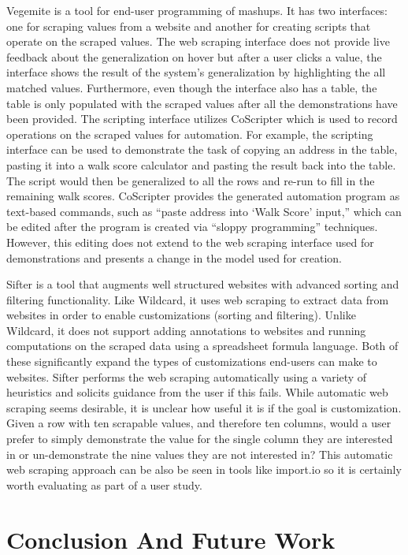 \documentclass[sigconf,10pt]{acmart}
\begin{document}
Vegemite \citep{lin2009} is a tool for end-user programming of mashups.
It has two interfaces: one for scraping values from a website and
another for creating scripts that operate on the scraped values. The web
scraping interface does not provide live feedback about the
generalization on hover but after a user clicks a value, the interface
shows the result of the system's generalization by highlighting the all
matched values. Furthermore, even though the interface also has a table,
the table is only populated with the scraped values after all the
demonstrations have been provided. The scripting interface utilizes
CoScripter \citep{leshed2008} which is used to record operations on the
scraped values for automation. For example, the scripting interface can
be used to demonstrate the task of copying an address in the table,
pasting it into a walk score calculator and pasting the result back into
the table. The script would then be generalized to all the rows and
re-run to fill in the remaining walk scores. CoScripter provides the
generated automation program as text-based commands, such as ``paste
address into `Walk Score' input,'' which can be edited after the program
is created via ``sloppy programming'' \citep{lin2009} techniques.
However, this editing does not extend to the web scraping interface used
for demonstrations and presents a change in the model used for creation.

Sifter \citep{huynh2006} is a tool that augments well structured
websites with advanced sorting and filtering functionality. Like
Wildcard, it uses web scraping to extract data from websites in order to
enable customizations (sorting and filtering). Unlike Wildcard, it does
not support adding annotations to websites and running computations on
the scraped data using a spreadsheet formula language. Both of these
significantly expand the types of customizations end-users can make to
websites. Sifter performs the web scraping automatically using a variety
of heuristics and solicits guidance from the user if this fails. While
automatic web scraping seems desirable, it is unclear how useful it is
if the goal is customization. Given a row with ten scrapable values, and
therefore ten columns, would a user prefer to simply demonstrate the
value for the single column they are interested in or un-demonstrate the
nine values they are not interested in? This automatic web scraping
approach can be also be seen in tools like import.io \citep{import.io}
so it is certainly worth evaluating as part of a user study.

\hypertarget{sec:conclusion}{%
\section{Conclusion And Future Work}\label{sec:conclusion}}
\end{document}
